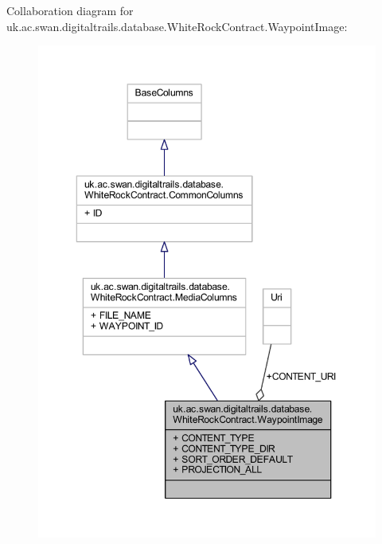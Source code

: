 Collaboration diagram for uk.\+ac.\+swan.\+digitaltrails.\+database.\+White\+Rock\+Contract.\+Waypoint\+Image\+:
\nopagebreak
\begin{figure}[H]
\begin{center}
\leavevmode
\includegraphics[width=350pt]{classuk_1_1ac_1_1swan_1_1digitaltrails_1_1database_1_1_white_rock_contract_1_1_waypoint_image__coll__graph}
\end{center}
\end{figure}
